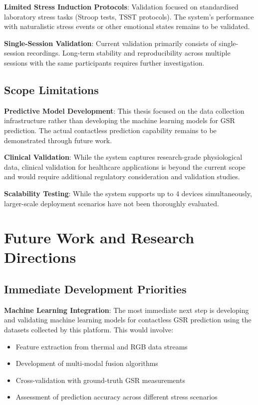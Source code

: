 \textbf{Limited Stress Induction Protocols}: Validation focused on standardised laboratory stress tasks (Stroop tests, TSST protocols). The system's performance with naturalistic stress events or other emotional states remains to be validated.

\textbf{Single-Session Validation}: Current validation primarily consists of single-session recordings. Long-term stability and reproducibility across multiple sessions with the same participants requires further investigation.

\subsection{Scope Limitations}

\textbf{Predictive Model Development}: This thesis focused on the data collection infrastructure rather than developing the machine learning models for GSR prediction. The actual contactless prediction capability remains to be demonstrated through future work.

\textbf{Clinical Validation}: While the system captures research-grade physiological data, clinical validation for healthcare applications is beyond the current scope and would require additional regulatory consideration and validation studies.

\textbf{Scalability Testing}: While the system supports up to 4 devices simultaneously, larger-scale deployment scenarios have not been thoroughly evaluated.

\section{Future Work and Research Directions}

\subsection{Immediate Development Priorities}

\textbf{Machine Learning Integration}: The most immediate next step is developing and validating machine learning models for contactless GSR prediction using the datasets collected by this platform. This would involve:

\begin{itemize}
\item Feature extraction from thermal and RGB data streams
\item Development of multi-modal fusion algorithms
\item Cross-validation with ground-truth GSR measurements
\item Assessment of prediction accuracy across different stress scenarios
\end{itemize}

